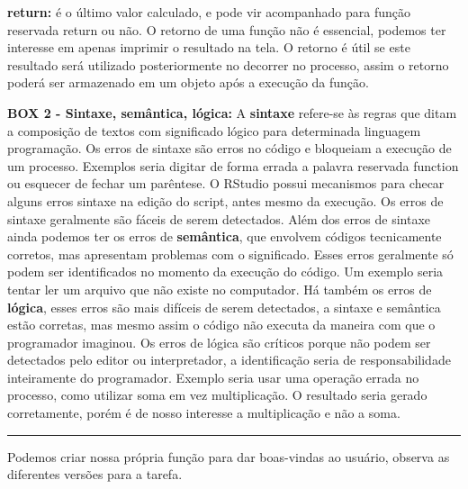 \documentclass[
  11pt,
  a5paper,
  openany]{book}
\begin{document}
\textbf{return:} é o último valor calculado, e pode vir acompanhado para função reservada return ou não. O retorno de uma função não é essencial, podemos ter interesse em apenas imprimir o resultado na tela. O retorno é útil se este resultado será utilizado posteriormente no decorrer no processo, assim o retorno poderá ser armazenado em um objeto após a execução da função.

\textbf{BOX 2 - Sintaxe, semântica, lógica:}
A \textbf{sintaxe} refere-se às regras que ditam a composição de textos com significado lógico para determinada linguagem programação. Os erros de sintaxe são erros no código e bloqueiam a execução de um processo. Exemplos seria digitar de forma errada a palavra reservada function ou esquecer de fechar um parêntese. O RStudio possui mecanismos para checar alguns erros sintaxe na edição do script, antes mesmo da execução. Os erros de sintaxe geralmente são fáceis de serem detectados. Além dos erros de sintaxe ainda podemos ter os erros de \textbf{semântica}, que envolvem códigos tecnicamente corretos, mas apresentam problemas com o significado. Esses erros geralmente só podem ser identificados no momento da execução do código. Um exemplo seria tentar ler um arquivo que não existe no computador. Há também os erros de \textbf{lógica}, esses erros são mais difíceis de serem detectados, a sintaxe e semântica estão corretas, mas mesmo assim o código não executa da maneira com que o programador imaginou. Os erros de lógica são críticos porque não podem ser detectados pelo editor ou interpretador, a identificação seria de responsabilidade inteiramente do programador. Exemplo seria usar uma operação errada no processo, como utilizar soma em vez multiplicação. O resultado seria gerado corretamente, porém é de nosso interesse a multiplicação e não a soma.

\begin{center}\rule{0.5\linewidth}{0.5pt}\end{center}

Podemos criar nossa própria função para dar boas-vindas ao usuário, observa as diferentes versões para a tarefa.
\end{document}
